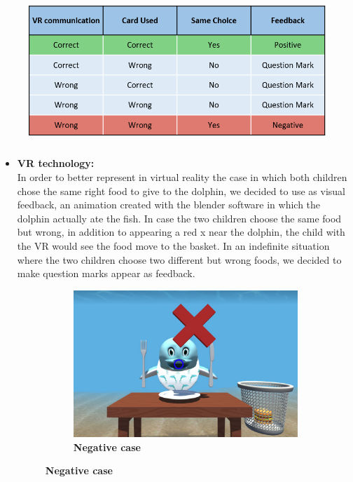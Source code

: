\documentclass [12pt]{article}
\begin{document}
\begin{figure}[ht!]
\centering
\includegraphics[height=5.5cm,width=13cm]{Feedback2.png}
\end{figure}

\begin{itemize}[•]
\item \textbf{VR technology:}\\
In order to better represent in virtual reality the case in which both children chose the same right food to give to the dolphin, we decided to use as visual feedback, an animation created with the blender software in which the dolphin actually ate the fish. In case the two children choose the same food but wrong, in addition to appearing a red x near the dolphin, the child with the VR would see the food move to the basket. In an indefinite situation where the two children choose two different but wrong foods, we decided to make question marks appear as feedback.
\begin{figure}[h!]
\centering
\hspace*{\fill}
\begin{subfigure}[tl]{0.3\linewidth}
\includegraphics[width=\linewidth]{NegativeCaseFood.jpg}
\caption{\textbf{Negative case}}

\end{subfigure}
\end{figure}
\end{itemize}
\end{document}
